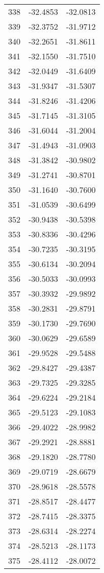 \documentclass{article}
\begin{document}
\begin{longtable}{|c|c|c|}
338 & -32.4853 & -32.0813 \\
339 & -32.3752 & -31.9712 \\
340 & -32.2651 & -31.8611 \\
341 & -32.1550 & -31.7510 \\
342 & -32.0449 & -31.6409 \\
343 & -31.9347 & -31.5307 \\
344 & -31.8246 & -31.4206 \\
345 & -31.7145 & -31.3105 \\
346 & -31.6044 & -31.2004 \\
347 & -31.4943 & -31.0903 \\
348 & -31.3842 & -30.9802 \\
349 & -31.2741 & -30.8701 \\
350 & -31.1640 & -30.7600 \\
351 & -31.0539 & -30.6499 \\
352 & -30.9438 & -30.5398 \\
353 & -30.8336 & -30.4296 \\
354 & -30.7235 & -30.3195 \\
355 & -30.6134 & -30.2094 \\
356 & -30.5033 & -30.0993 \\
357 & -30.3932 & -29.9892 \\
358 & -30.2831 & -29.8791 \\
359 & -30.1730 & -29.7690 \\
360 & -30.0629 & -29.6589 \\
361 & -29.9528 & -29.5488 \\
362 & -29.8427 & -29.4387 \\
363 & -29.7325 & -29.3285 \\
364 & -29.6224 & -29.2184 \\
365 & -29.5123 & -29.1083 \\
366 & -29.4022 & -28.9982 \\
367 & -29.2921 & -28.8881 \\
368 & -29.1820 & -28.7780 \\
369 & -29.0719 & -28.6679 \\
370 & -28.9618 & -28.5578 \\
371 & -28.8517 & -28.4477 \\
372 & -28.7415 & -28.3375 \\
373 & -28.6314 & -28.2274 \\
374 & -28.5213 & -28.1173 \\
375 & -28.4112 & -28.0072 \\

\end{longtable}
\end{document}
